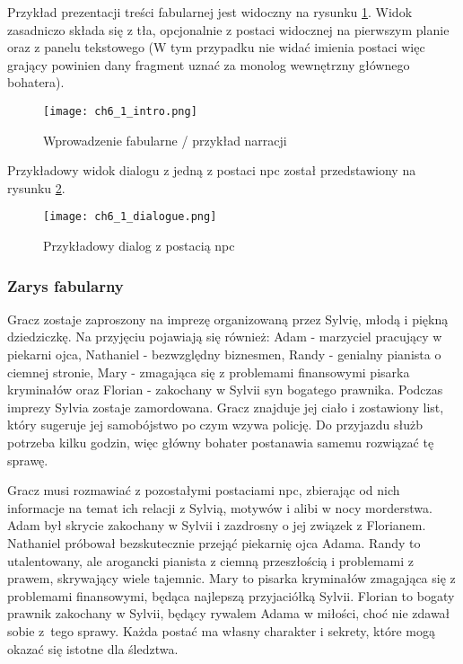 \newpage
Przykład prezentacji treści fabularnej jest widoczny na rysunku \ref{fig:ch6_1_intro}. Widok
zasadniczo składa się z tła, opcjonalnie z postaci widocznej na pierwszym planie oraz z panelu
tekstowego (W tym przypadku nie widać imienia postaci więc grający powinien dany fragment uznać
za monolog wewnętrzny głównego bohatera).

\begin{figure}[h!]
    \centering
    \texttt{[image: ch6\_1\_intro.png]}
    \caption{Wprowadzenie fabularne / przykład narracji}
    \label{fig:ch6_1_intro}
\end{figure}

Przykładowy widok dialogu z jedną z postaci \gls{npc} został przedstawiony na rysunku \ref{fig:ch6_1_dialogue}.

\begin{figure}[h!]
    \centering
    \texttt{[image: ch6\_1\_dialogue.png]}
    \caption{Przykładowy dialog z postacią \gls{npc}}
    \label{fig:ch6_1_dialogue}
\end{figure}

\subsubsection*{Zarys fabularny}

Gracz zostaje zaproszony na imprezę organizowaną przez Sylvię, młodą i piękną dziedziczkę. Na
przyjęciu pojawiają się również: Adam - marzyciel pracujący w piekarni ojca, Nathaniel -
bezwzględny biznesmen, Randy - genialny pianista o ciemnej stronie, Mary - zmagająca się z
problemami finansowymi pisarka kryminałów oraz Florian - zakochany w Sylvii syn bogatego prawnika.
Podczas imprezy Sylvia zostaje zamordowana. Gracz znajduje jej ciało i zostawiony list, który
sugeruje jej samobójstwo po czym wzywa policję. Do przyjazdu służb potrzeba kilku godzin, więc
główny bohater postanawia samemu rozwiązać tę sprawę.

Gracz musi rozmawiać z pozostałymi postaciami \gls{npc}, zbierając od nich informacje na temat ich
relacji z Sylvią, motywów i alibi w nocy morderstwa. Adam był skrycie zakochany w Sylvii i
zazdrosny o jej związek z Florianem. Nathaniel próbował bezskutecznie przejąć piekarnię ojca Adama.
Randy to utalentowany, ale arogancki pianista z ciemną przeszłością i problemami z prawem,
skrywający wiele tajemnic. Mary to pisarka kryminałów zmagająca się z problemami finansowymi,
będąca najlepszą przyjaciółką Sylvii. Florian to bogaty prawnik zakochany w Sylvii, będący rywalem
Adama w miłości, choć nie zdawał sobie z~tego sprawy. Każda postać ma własny charakter i sekrety,
które mogą okazać się istotne dla śledztwa.

